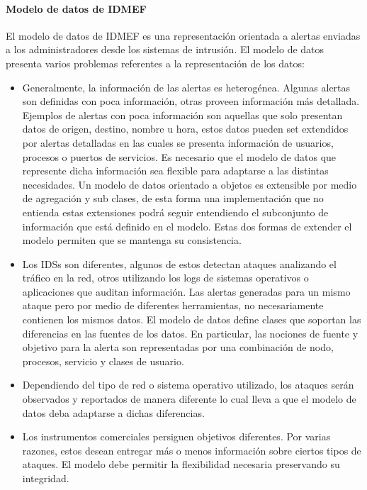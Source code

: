 \paragraph{Modelo de datos de IDMEF}
El modelo de datos de IDMEF es una representación orientada a alertas enviadas a 
los administradores desde los sistemas de intrusión. El modelo de datos presenta 
varios problemas referentes a la representación de los datos:
\begin{itemize}
  \item Generalmente, la información de las alertas es heterogénea. Algunas 
  alertas son definidas con poca información, otras proveen información más 
  detallada. Ejemplos de alertas con poca información son aquellas que solo 
  presentan datos de origen, destino, nombre u hora, estos datos pueden set 
  extendidos por alertas detalladas en las cuales se presenta información de 
  usuarios, procesos o puertos de servicios. Es necesario que el modelo de datos 
  que represente dicha información sea flexible para adaptarse a las distintas 
  necesidades. Un modelo de datos orientado a objetos es extensible por medio de 
  agregación y sub clases, de esta forma una implementación que no entienda 
  estas extensiones podrá seguir entendiendo el subconjunto de información que 
  está definido en el modelo. Estas dos formas de extender el modelo permiten 
  que se mantenga su consistencia.
  \item Los IDSs son diferentes, algunos de estos detectan ataques analizando el 
  tráfico en la red, otros utilizando los logs de sistemas operativos o 
  aplicaciones que auditan información. Las alertas generadas para un mismo 
  ataque pero por medio de diferentes herramientas, no necesariamente contienen 
  los mismos datos. El modelo de datos define clases que soportan las 
  diferencias en las fuentes de los datos. En particular, las nociones de 
  fuente y objetivo para la alerta son representadas por una combinación de 
  nodo, procesos, servicio y clases de usuario.
  \item Dependiendo del tipo de red o sistema operativo utilizado, los 
  ataques serán observados y reportados de manera diferente lo cual lleva a que 
  el modelo de datos deba adaptarse a dichas diferencias.
  \item Los instrumentos comerciales persiguen objetivos diferentes. Por varias 
  razones, estos desean entregar más o menos información sobre ciertos tipos de 
  ataques. El modelo debe permitir la flexibilidad necesaria preservando su 
  integridad.
\end{itemize}

